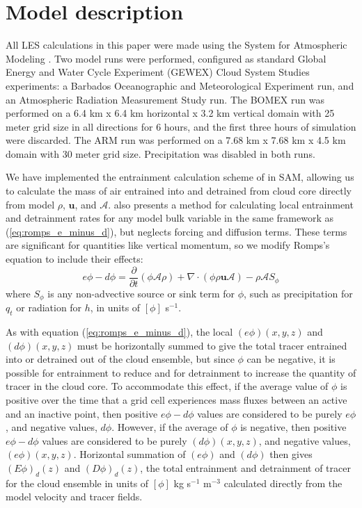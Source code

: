 \documentclass[12pt]{article}
\begin{document}

\section{Model description}

All LES calculations in this paper were made using the System for Atmospheric 
Modeling \citep[SAM;][]{Khairoutdinov2003}.  Two model runs were performed, 
configured as standard Global Energy and Water Cycle Experiment (GEWEX) 
Cloud System Studies \citep[GCSS;][]{Randall2003} experiments: a Barbados 
Oceanographic and Meteorological Experiment \citep[BOMEX;][]{Siebesma2003} run,
and an Atmospheric Radiation Measurement Study \citep[ARM;][]{Brown2002} run. 
The BOMEX run was performed on a 6.4 km x 6.4 km horizontal x 3.2 km vertical 
domain with 25 meter grid size in all directions for 6 hours, and the first 
three hours of simulation were discarded. The ARM run was performed on a 
7.68 km x 7.68 km x 4.5 km domain with 30 meter grid size.  Precipitation was 
disabled in both runs.

We have implemented the entrainment calculation scheme of \cite{Romps2010} in 
SAM, allowing us to calculate the mass of air entrained into and detrained from
cloud core directly from model $\rho$, $\mathbf{u}$, and $\mathcal{A}$.  
\citet[eq. 4]{Romps2010} also presents a method for calculating local 
entrainment and detrainment rates for any model bulk variable in the same
framework as (\ref{eq:romps_e_minus_d}), but neglects forcing and diffusion
terms.  These terms are significant for quantities like vertical momentum, so 
we modify Romps's equation to include their effects:
\begin{equation}
  \label{eq:romps_ephi_minus_dphi}
  e\phi - d\phi = \frac{\partial}{\partial t}(\phi \mathcal{A} \rho) 
                + \nabla \cdot (\phi \rho \mathbf{u} \mathcal{A})
                - \rho \mathcal{A}S_\phi
\end{equation}
where $S_\phi$ is any non-advective source or sink term for $\phi$, such as 
precipitation for $q_t$ or radiation for $h$, in units of $[\phi]$ s$^{-1}$.  

As with equation (\ref{eq:romps_e_minus_d}), the local $(e\phi)(x,y,z)$
and $(d\phi)(x,y,z)$ must be horizontally summed to give the total
tracer entrained into or detrained out of the cloud ensemble, but
since $\phi$ can be negative, it is possible for entrainment to reduce
and for detrainment to increase the quantity of tracer in the cloud
core.  To accommodate this effect, if the average value of $\phi$ is
positive over the time that a grid cell experiences mass fluxes
between an active and an inactive point, then positive $e\phi-d\phi$
values are considered to be purely $e\phi$, and negative
values, $d\phi$.  However, if the average of $\phi$ is
negative, then positive $e\phi-d\phi$ values are considered to be
purely $(d\phi)(x,y,z)$, and negative values, $(e\phi)(x,y,z)$.
Horizontal summation of $(e\phi)$ and $(d\phi)$ then gives
$(E\phi)_d(z)$ and $(D\phi)_d(z)$, the total entrainment and
detrainment of tracer for the cloud ensemble in units of $[\phi]$ kg s$^{-1}$
m$^{-3}$ calculated directly from the model velocity and tracer fields.
\end{document}
